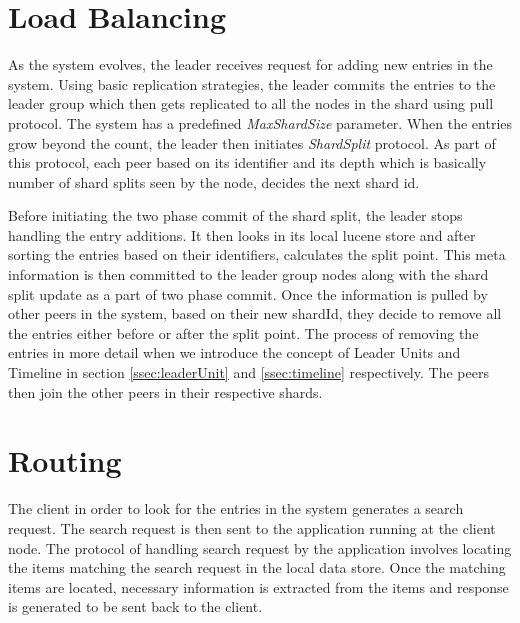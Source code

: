 \documentclass[a4paper,11pt]{kth-mag}
\begin{document}
\section{Load Balancing}
\label{ssec:loadBalance}
As the system evolves, the leader receives request for adding new entries in the system. Using basic replication strategies, the leader commits the entries to the leader group which then gets replicated to all the nodes in the shard using pull protocol. The system has a predefined \textit{MaxShardSize} parameter. When the entries grow beyond the count, the leader then initiates \textit{ShardSplit} protocol. As part of this protocol, each peer based on its identifier and its depth which is basically number of shard splits seen by the node, decides the next shard id.
\par Before initiating the two phase commit of the shard split, the leader stops handling the entry additions. It then looks in its local lucene store and after sorting the entries based on their identifiers, calculates the split point. This meta information is then committed to the leader group nodes along with the shard split update as a part of two phase commit. Once the information is pulled by other peers in the system, based on their new shardId, they decide to remove all the entries either before or after the split point. The process of removing the entries in more detail when we introduce the concept of Leader Units and Timeline in section \ref{ssec:leaderUnit} and \ref{ssec:timeline} respectively. The peers then join the other peers in their respective shards.



\section{Routing}
\label{ssec:routing}

\par The client in order to look for the entries in the system generates a search request. The search request is then sent to the application running at the client node. The protocol of handling search request by the application involves locating the items matching the search request in the local data store. Once the matching items are located, necessary information is extracted from the items and response is generated to be sent back to the client.
\end{document}
